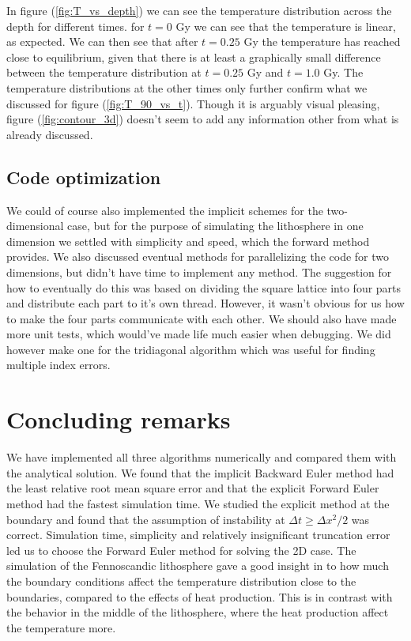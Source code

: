 \documentclass{article}
\begin{document}
\begin{multicols}{2}
In figure (\ref{fig:T_vs_depth}) we can see the temperature distribution across the depth for different times. for $t=0$ Gy we can see that the temperature is linear, as expected. We can then see that after $t=0.25$ Gy the temperature has reached close to equilibrium, given that there is at least a graphically small difference between the temperature distribution at $t=0.25$ Gy and $t=1.0$ Gy. The temperature distributions at the other times only further confirm what we discussed for figure (\ref{fig:T_90_vs_t}). Though it is arguably visual pleasing, figure (\ref{fig:contour_3d}) doesn't seem to add any information other from what is already discussed. 

\subsection{Code optimization}
We could of course also implemented the implicit schemes for the two-dimensional case, but for the purpose of simulating the lithosphere in one dimension we settled with simplicity and speed, which the forward method provides. We also discussed eventual methods for parallelizing the code for two dimensions, but didn't have time to implement any method. The suggestion for how to eventually do this was based on dividing the square lattice into four parts and distribute each part to it's own thread. However, it wasn't obvious for us how to make the four parts communicate with each other. We should also have made more unit tests, which would've made life much easier when debugging. We did however make one for the tridiagonal algorithm which was useful for finding multiple index errors.
 
\section{Concluding remarks}

We have implemented all three algorithms numerically and compared them with the analytical solution. We found that the implicit Backward Euler method had the least relative root mean square error and that the explicit Forward Euler method had the fastest simulation time. We studied the explicit method at the boundary and found that the assumption of instability at $\Delta t \geq \Delta x^2/2$ was correct. Simulation time, simplicity and relatively insignificant truncation error led us to choose the Forward Euler method for solving the 2D case. The simulation of the Fennoscandic lithosphere gave a good insight in to how much the boundary conditions affect the temperature distribution close to the boundaries, compared to the effects of heat production. This is in contrast with the behavior in the middle of the lithosphere, where the heat production affect the temperature more. 


\end{multicols}
\end{document}
